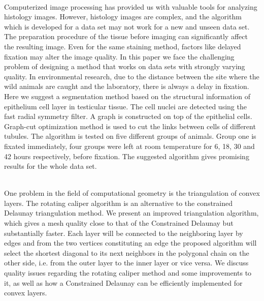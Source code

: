{{{\begin{enumerate}
\\ \aabstract
Computerized image processing has provided us with valuable tools for analyzing histology images. However, histology images are complex, and the algorithm which is developed for a data set may not work for a new and unseen data set. The preparation procedure of the tissue before imaging can significantly affect the resulting image. Even for the same staining method, factors like delayed fixation may alter the image quality. In this paper we face the challenging problem of designing a method that works on data sets with strongly varying quality. In environmental research, due to the distance between the site where the wild animals are caught and the laboratory, there is always a delay in fixation. Here we suggest a segmentation method based on the structural information of epithelium cell layer in testicular tissue. The cell nuclei are detected using the fast radial symmetry filter. A graph is constructed on top of the epithelial cells. Graph-cut optimization method is used to cut the links between cells of different tubules. The algorithm is tested on five different groups of animals. Group one is fixated immediately, four groups were left at room temperature for 6, 18, 30 and 42 hours respectively, before fixation. The suggested algorithm gives promising results for the whole data set.


\\ \aabstract
One problem in the field of computational geometry is the triangulation of convex layers. The rotating caliper algorithm is an alternative to the constrained Delaunay triangulation method. We present an improved triangulation algorithm, which gives a mesh quality close to that of the Constrained Delaunay but substantially faster. Each layer will be connected to the neighboring layer by edges and from the two vertices constituting an edge the proposed algorithm will select the shortest diagonal to its next neighbors in the polygonal chain on the other side, i.e. from the outer layer to the inner layer or vice versa. We discuss quality issues regarding the rotating caliper method and some improvements to it, as well as how a Constrained Delaunay can be efficiently implemented for convex layers. 


\end{enumerate}}}}
